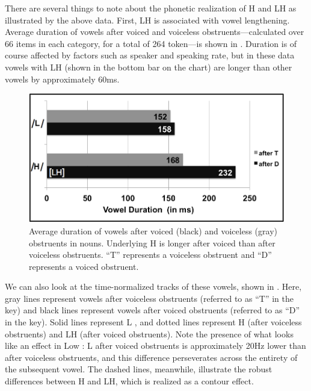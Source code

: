 \documentclass[output=paper
,newtxmath
,modfonts
,nonflat]{langsci/langscibook}
\begin{document}
There are several things to note about the phonetic realization of H and LH as illustrated by the above data. First, LH  is associated with vowel lengthening. Average duration of vowels after voiced and voiceless obstruents—calculated over 66 items in each category, for a total of 264 token—is shown in . Duration is of course affected by factors such as speaker and speaking rate, but in these data vowels with LH  (shown in the bottom bar on the chart) are longer than other vowels by approximately 60ms.


\begin{figure} 
\includegraphics[width=\textwidth]{figures/Lotven-img3.png}
\caption{\label{fig:lotven:3} Average duration of vowels after voiced (black) and voiceless (gray) obstruents in nouns. Underlying H is longer after voiced than after voiceless obstruents. “T” represents a voiceless obstruent and “D” represents a voiced obstruent.}
\end{figure}


We can also look at the time-normalized  tracks of these vowels, shown in . Here, gray lines represent vowels after voiceless obstruents (referred to as “T” in the key) and black lines represent vowels after voiced obstruents (referred to as “D” in the key). Solid lines represent L , and dotted lines represent H (after voiceless obstruents) and LH (after voiced obstruents). Note the presence of what looks like an   effect in Low : L after voiced obstruents is approximately 20Hz lower than after voiceless obstruents, and this difference perseverates across the entirety of the subsequent vowel. The dashed lines, meanwhile, illustrate the robust  differences between H and LH, which is realized as a contour effect. 
\end{document}
